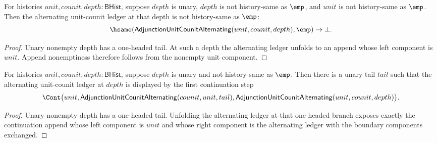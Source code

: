 \begin{theorem}
\label{thm:adjunction-unit-counit-alternating-positive-depth-unit-nonempty}
For histories $unit,counit,depth:\mathsf{BHist}$, suppose $depth$ is unary,
$depth$ is not history-same as $\emp$, and $unit$ is not history-same as
$\emp$. Then the alternating unit-counit ledger at that depth is not
history-same as $\emp$:
$$
\hsame(\mathsf{AdjunctionUnitCounitAlternating}(unit,counit,depth),\emp)\to\bot.
$$
\end{theorem}
\begin{proof}
Unary nonempty depth has a one-headed tail. At such a depth the alternating
ledger unfolds to an append whose left component is $unit$. Append nonemptiness
therefore follows from the nonempty unit component.
\end{proof}

\begin{theorem}
\label{thm:adjunction-unit-counit-alternating-positive-depth-cont-readback}
For histories $unit,counit,depth:\mathsf{BHist}$, suppose $depth$ is unary
and not history-same as $\emp$. Then there is a unary tail $tail$ such that
the alternating unit-counit ledger at $depth$ is displayed by the first
continuation step
$$
\Cont\bigl(unit,\mathsf{AdjunctionUnitCounitAlternating}(counit,unit,tail),
\mathsf{AdjunctionUnitCounitAlternating}(unit,counit,depth)\bigr).
$$
\end{theorem}
\begin{proof}
Unary nonempty depth has a one-headed tail. Unfolding the alternating ledger
at that one-headed branch exposes exactly the continuation append whose left
component is $unit$ and whose right component is the alternating ledger with
the boundary components exchanged.
\end{proof}

